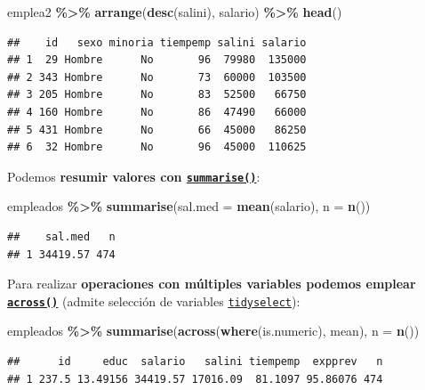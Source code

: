 \documentclass[
]{book}
\newenvironment{Shaded}{\begin{snugshade}}{\end{snugshade}}
\newcommand{\AttributeTok}[1]{\textcolor[rgb]{0.13,0.29,0.53}{#1}}
\newcommand{\FunctionTok}[1]{\textcolor[rgb]{0.13,0.29,0.53}{\textbf{#1}}}
\newcommand{\NormalTok}[1]{#1}
\newcommand{\SpecialCharTok}[1]{\textcolor[rgb]{0.81,0.36,0.00}{\textbf{#1}}}
\theoremstyle{break}
\theoremstyle{nonumberplain}
\begin{document}
\begin{Shaded}
\begin{Highlighting}[]
\NormalTok{emplea2 }\SpecialCharTok{\%\textgreater{}\%} \FunctionTok{arrange}\NormalTok{(}\FunctionTok{desc}\NormalTok{(salini), salario) }\SpecialCharTok{\%\textgreater{}\%} \FunctionTok{head}\NormalTok{()}
\end{Highlighting}
\end{Shaded}

\begin{verbatim}
##    id   sexo minoria tiempemp salini salario
## 1  29 Hombre      No       96  79980  135000
## 2 343 Hombre      No       73  60000  103500
## 3 205 Hombre      No       83  52500   66750
## 4 160 Hombre      No       86  47490   66000
## 5 431 Hombre      No       66  45000   86250
## 6  32 Hombre      No       96  45000  110625
\end{verbatim}

Podemos \textbf{resumir valores con \href{https://dplyr.tidyverse.org/reference/summarise.html}{\texttt{summarise()}}}:

\begin{Shaded}
\begin{Highlighting}[]
\NormalTok{empleados }\SpecialCharTok{\%\textgreater{}\%} \FunctionTok{summarise}\NormalTok{(}\AttributeTok{sal.med =} \FunctionTok{mean}\NormalTok{(salario), }\AttributeTok{n =} \FunctionTok{n}\NormalTok{())}
\end{Highlighting}
\end{Shaded}

\begin{verbatim}
##    sal.med   n
## 1 34419.57 474
\end{verbatim}

Para realizar \textbf{operaciones con múltiples variables podemos emplear \href{https://dplyr.tidyverse.org/reference/across.html}{\texttt{across()}}} (admite selección de variables \href{https://tidyselect.r-lib.org}{\texttt{tidyselect}}):

\begin{Shaded}
\begin{Highlighting}[]
\NormalTok{empleados }\SpecialCharTok{\%\textgreater{}\%} \FunctionTok{summarise}\NormalTok{(}\FunctionTok{across}\NormalTok{(}\FunctionTok{where}\NormalTok{(is.numeric), mean), }\AttributeTok{n =} \FunctionTok{n}\NormalTok{())}
\end{Highlighting}
\end{Shaded}

\begin{verbatim}
##      id     educ  salario   salini tiempemp  expprev   n
## 1 237.5 13.49156 34419.57 17016.09  81.1097 95.86076 474
\end{verbatim}
\end{document}
